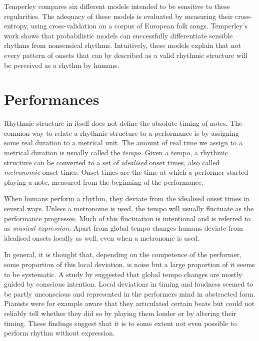 Temperley compares six different models intended to be sensitive to these regularities. The adequacy of these models is evaluated by measuring their cross-entropy, using cross-validation on a corpus of European folk songs. Temperley's work shows that probabilistic models can successfully differentiate sensible rhythms from nonsensical rhythms. Intuitively, these models explain that not every pattern of onsets that can by described as a valid rhythmic structure will be perceived as a rhythm by humans. 


\section{Performances}
\label{sec:performances}

Rhythmic structure in itself does not define the absolute timing of notes. The common way to relate a rhythmic structure to a performance is by assigning some real duration to a metrical unit. The amount of real time we assign to a metrical duration is usually called the \textit{tempo}. Given a tempo, a rhythmic structure can be converted to a set of \textit{idealised} onset times, also called \textit{metronomic} onset times. Onset times are the time at which a performer started playing a note, measured from the beginning of the performance.

When humans perform a rhythm, they deviate from the idealised onset times in several ways. Unless a metronome is used, the tempo will usually fluctuate as the performance progresses. Much of this fluctuation is intentional and is referred to as \textit{musical expression}. Apart from global tempo changes humans deviate from idealised onsets locally as well, even when a metronome is used. 

In general, it is thought that, depending on the competence of the performer, some proportion of this local deviation, is noise but a large proportion of it seems to be systematic. A study by \citet{palmer1989mapping} suggested that global tempo changes are mostly guided by conscious intention. Local deviations in timing and loudness seemed to be partly unconscious and represented in the performers mind in abstracted form. Pianists were for example aware that they articulated certain beats but could not reliably tell whether they did so by playing them louder or by altering their timing. These findings suggest that it is to some extent not even possible to perform rhythm without expression.

